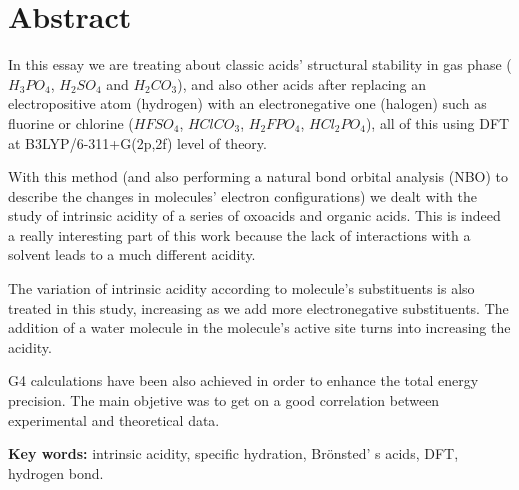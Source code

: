 
\chapter*{Abstract} 

\begin{comment}
En este ensayo se trata la estabilidad estructural de ácidos clásicos en fase gas $H_3PO_4$, $H_2SO_4$ y $H_2CO_3$, y de ácidos cuando se sustituye un átomo electropositivo (hidrógeno) por uno electronegativo (halógeno) como el flúor y el cloro, $HFSO_4$, $HClCO_3$, $H_2FPO_4$, $HCl_2PO_4$ utilizando el método DFT B3LYP/6-311+G(2p,2f).

Con este método y haciendo un análisis de poblaciones NBO para describir los cambios en las configurciones electrónicas de las moléculas, se abordó también el estudio de la acidez intrínseca de una serie de oxácidos y ácidos orgánicos, siendo este apartado de gran interés, ya que la ausencia de interacciones con un disolvente resulta a una acidez muy diferente. 

La variación de acidez intrínseca según los sustituyentes de la molécula también se aborda en el presente proyecto, aumentando a medida que hay más sustituyentes electronegativos. La adición de una molécula de agua en el punto activo de la molécula se traduce en un aumento de su acidez.

Se han empleado cálculos G4 para hacer un análisis más preciso de algunos resultados dudosos con el fin de relacionar los resultados expuestos en el presente trabajo, es importante destacar que dichos resultados están de acuerdo con los datos experimentales previamente dados.
\end{comment}


In this essay we are treating about classic acids' structural stability in gas phase ($H_3PO_4$, $H_2SO_4$ and $H_2CO_3$), and also other acids after replacing an electropositive atom (hydrogen) with an electronegative one (halogen) such as fluorine or chlorine ($HFSO_4$, $HClCO_3$, $H_2FPO_4$, $HCl_2PO_4$), all of this using DFT at B3LYP/6-311+G(2p,2f) level of theory.

With this method (and also performing a natural bond orbital analysis (NBO) to describe the changes in molecules' electron configurations) we dealt with the study of intrinsic acidity of a series of oxoacids and organic acids. This is indeed a really interesting part of this work because the lack of interactions with a solvent leads to a much different acidity.

The variation of intrinsic acidity according to molecule's substituents is also treated in this study, increasing as we add more electronegative substituents.  The addition of a water molecule in the molecule's active site turns into increasing the acidity.

G4 calculations have been also achieved in order to enhance the total energy precision. The main objetive was to get on a good correlation between experimental and theoretical data. 


\vspace{5mm}
\textbf{Key words:} intrinsic acidity, specific hydration, Brönsted' s acids, DFT, hydrogen bond.